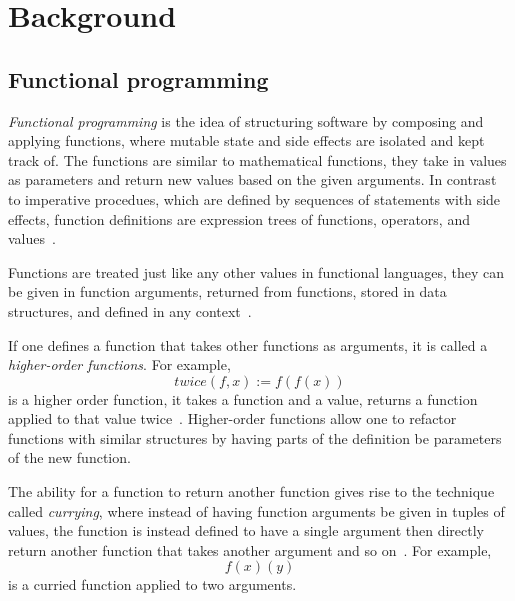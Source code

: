 \chapter{Background}\label{ch:background}

\section{Functional programming}\label{sec:functional}

\emph{Functional programming} is the idea of structuring software by
composing and applying functions, where mutable state and side effects are
isolated and kept track of. The functions are similar to mathematical functions,
they take in values as parameters and return new values based on the given
arguments. In contrast to imperative procedues, which are defined by sequences
of statements with side effects, function definitions are expression trees of
functions, operators, and values~\cite{functional-Hudak, functional-Hughes}.

Functions are treated just like any other values in functional languages, they
can be given in function arguments, returned from functions, stored in data
structures, and defined in any context~\cite{functional-Hudak, sicp}.

If one defines a function that takes other functions as arguments, it is called
a \emph{higher-order functions}. For example,
\begin{equation}
  \mathit{twice}(f, x) := f(f(x))
  \label{eq:higher-order-ex}
\end{equation}
is a higher order function, it takes a function and a value, returns a function
applied to that value twice~\cite{functional-Hudak, lambda-Revesz}. Higher-order
functions allow one to refactor functions with similar structures by having
parts of the definition be parameters of the new function.

The ability for a function to return another function gives rise to the
technique called \emph{currying}, where instead of having function arguments be
given in tuples of values, the function is instead defined to have a single
argument then directly return another function that takes another argument and
so on~\cite{functional-Hudak, functional-Barendregt, lambda-Revesz}. For
example,
\begin{equation}
  f(x)(y)
  \label{eq:curry-ex}
\end{equation}
is a curried function applied to two arguments.


